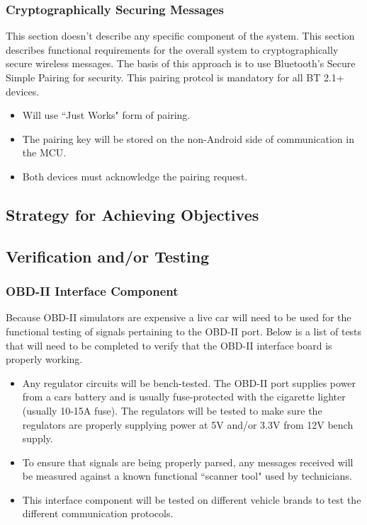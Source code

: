 \documentclass[12pt,letterpaper]{article}
\begin{document}
\subsubsection{Cryptographically Securing Messages}
This section doesn't describe any specific component of the system. This section describes functional requirements for the overall system to cryptographically secure wireless messages. The basis of this approach is to use Bluetooth's Secure Simple Pairing for security. This pairing protcol is mandatory for all BT 2.1+ devices.

\begin{itemize}
	\item Will use ``Just Works" form of pairing.
	\item The pairing key will be stored on the non-Android side of communication in the MCU.
	\item Both devices must acknowledge the pairing request.
\end{itemize}

\subsection{Strategy for Achieving Objectives}

\subsection{Verification and/or Testing}
\subsubsection{OBD-II Interface Component}
Because OBD-II simulators are expensive a live car will need to be used for the functional testing of signals pertaining to the OBD-II port. Below is a list of tests that will need to be completed to verify that the OBD-II interface board is properly working.

\begin{itemize}
\item Any regulator circuits will be bench-tested. The OBD-II port supplies power from a cars battery and is usually fuse-protected with the cigarette lighter (usually 10-15A fuse). The regulators will be tested to make sure the regulators are properly supplying power at 5V and/or 3.3V from 12V bench supply.
\item To ensure that signals are being properly parsed, any messages received will be measured against a known functional ``scanner tool" used by technicians.
\item This interface component will be tested on different vehicle brands to test the different communication protocols.
\end{itemize}
\end{document}
